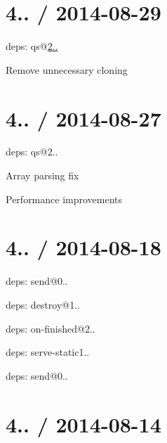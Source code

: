 \section*{4.. / 2014-\/08-\/29 }


\begin{DoxyItemize}
\item deps\+: qs@\hyperlink{namespace2_1_12_1_12}{2..}
\begin{DoxyItemize}
\item Remove unnecessary cloning
\end{DoxyItemize}
\end{DoxyItemize}

\section*{4.. / 2014-\/08-\/27 }


\begin{DoxyItemize}
\item deps\+: qs@2..
\begin{DoxyItemize}
\item Array parsing fix
\item Performance improvements
\end{DoxyItemize}
\end{DoxyItemize}

\section*{4.. / 2014-\/08-\/18 }


\begin{DoxyItemize}
\item deps\+: send@0..
\begin{DoxyItemize}
\item deps\+: destroy@1..
\item deps\+: on-\/finished@2..
\end{DoxyItemize}
\item deps\+: serve-\/static1..
\begin{DoxyItemize}
\item deps\+: send@0..
\end{DoxyItemize}
\end{DoxyItemize}

\section*{4.. / 2014-\/08-\/14 }


